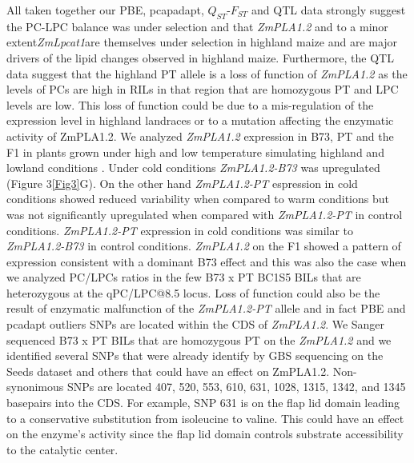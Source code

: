 \documentclass[9pt,twocolumn,twoside,lineno]{gsajnl}
\begin{document}
All taken together our PBE, pcapadapt, $Q_{ST}$-$F_{ST}$ and QTL data strongly suggest the PC-LPC balance was under selection and that \textit{ZmPLA1.2} and to a minor extent\textit{ZmLpcat1}are themselves under selection in highland maize and are major drivers of the lipid changes observed in highland maize. 
Furthermore, the QTL data suggest that the highland PT allele is a loss of function of \textit{ZmPLA1.2} as the levels of PCs are high in RILs in that region that are homozygous PT and LPC levels are low. 
This loss of function could be due to a mis-regulation of the expression level in highland landraces or to a mutation affecting the enzymatic activity of ZmPLA1.2. 
We analyzed \textit{ZmPLA1.2} expression in B73, PT and the F1 in plants grown under high and low temperature simulating highland and lowland conditions \cite{Crow2020-gene}. 
Under cold conditions \textit{ZmPLA1.2-B73} was upregulated (Figure 3\ref{Fig3}G). 
On the other hand \textit{ZmPLA1.2-PT} espression in cold conditions showed reduced variability when compared to warm conditions but was not significantly upregulated when compared with \textit{ZmPLA1.2-PT} in control conditions.
\textit{ZmPLA1.2-PT} expression in cold conditions was similar to \textit{ZmPLA1.2-B73} in control conditions.
\textit{ZmPLA1.2} on the F1 showed a pattern of expression consistent with a dominant B73 effect and this was also the case when we analyzed PC/LPCs ratios in the few B73 x PT BC1S5 BILs that are heterozygous at the qPC/LPC@8.5 locus. 
Loss of function could also be the result of enzymatic malfunction of the \textit{ZmPLA1.2-PT} allele and in fact PBE and pcadapt outliers SNPs are located within the CDS of \textit{ZmPLA1.2}. 
We Sanger sequenced B73 x PT BILs that are homozygous PT on the \textit{ZmPLA1.2} and we identified several SNPs that were already identify by GBS sequencing on the Seeds dataset and others that could have an effect on ZmPLA1.2. Non-synonimous SNPs are located 407, 520, 553, 610, 631, 1028, 1315, 1342, and 1345 basepairs into the CDS.
For example, SNP 631 is on the flap lid domain leading to a conservative substitution from isoleucine to valine. This could have an effect on the enzyme's activity since the flap lid domain controls substrate accessibility to the catalytic center. 
\end{document}
